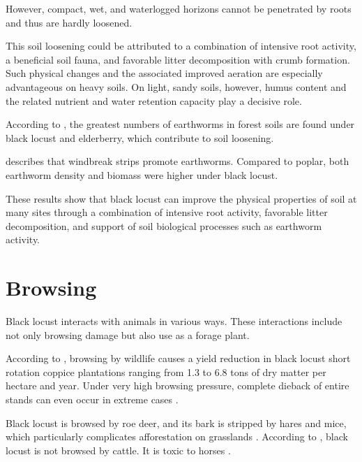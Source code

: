 However, compact, wet, and waterlogged horizons cannot be penetrated by roots \citep{auten1933robineStandort,mueller1991robinie} and thus are hardly loosened.

This soil loosening could be attributed to a combination of intensive root activity, a beneficial soil fauna, and favorable litter decomposition with crumb formation. Such physical changes and the associated improved aeration are especially advantageous on heavy soils. On light, sandy soils, however, humus content and the related nutrient and water retention capacity play a decisive role.

According to \citet{bluemke1955robinie}, the greatest numbers of earthworms in forest soils are found under black locust and elderberry, which contribute to soil loosening.

\citet{vaupel2023robinie} describes that windbreak strips promote earthworms. Compared to poplar, both earthworm density and biomass were higher under black locust.

These results show that black locust can improve the physical properties of soil at many sites through a combination of intensive root activity, favorable litter decomposition, and support of soil biological processes such as earthworm activity.


\section{Browsing}


Black locust interacts with animals in various ways. These interactions include not only browsing damage but also use as a forage plant.

According to \citet{landgraf2014immenser}, browsing by wildlife causes a yield reduction in black locust short rotation coppice plantations ranging from 1.3 to 6.8 tons of dry matter per hectare and year. Under very high browsing pressure, complete dieback of entire stands can even occur in extreme cases \citep{landgraf2024robinie1,landgraf2024robinie2}.

Black locust is browsed by roe deer, and its bark is stripped by hares and mice, which particularly complicates afforestation on grasslands \citep{barta2023robinieReh}. According to \citet{berner2018robinie}, black locust is not browsed by cattle. It is toxic to horses \citep{grosche2008robiniePferd}.

